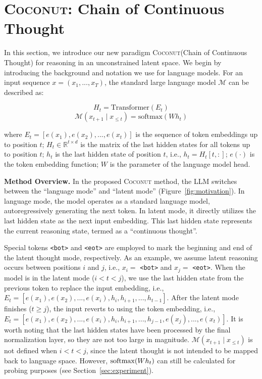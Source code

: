 \documentclass[]{fairmeta}
\newcommand{\ours}{\textsc{Coconut}\xspace}
\begin{document}
\section{\ours: Chain of Continuous Thought}
\label{sec:ours}
In this section, we introduce our new paradigm \ours (Chain of Continuous Thought) for reasoning in an unconstrained latent space. We begin by introducing the background and notation we use for language models. For an input sequence $x = (x_1, ..., x_T)$, the standard large language model $\mathcal{M}$ can be described as:

$$H_t = \text{Transformer}(E_t)$$
$$\mathcal{M}(x_{t+1}\mid x_{\leq t}) = \text{softmax}(Wh_t)$$

where $E_t = [e(x_1), e(x_2), ..., e(x_t)]$ is the sequence of token embeddings up to position $t$;
$H_t \in \mathbb{R}^{t \times d}$ is the matrix of the last hidden states for all tokens up to position $t$; $h_t$ is the last hidden state of position $t$, i.e., $h_t=H_t[t, :]$; $e(\cdot)$ is the token embedding function; $W$ is the parameter of the language model head.

\noindent\textbf{Method Overview.} In the proposed \ours method, the LLM switches between the ``language mode'' and ``latent mode'' (Figure~\ref{fig:motivation}). In language mode, the model operates as a standard language model, autoregressively generating the next token. In latent mode, it directly utilizes the last hidden state as the next input embedding. This last hidden state represents the current reasoning state, termed as a ``continuous thought''.

Special tokens \texttt{<bot>} and \texttt{<eot>} are employed to mark the beginning and end of the latent thought mode, respectively. As an example, we assume latent reasoning occurs between positions $i$ and $j$, i.e., $x_i=$ \texttt{<bot>} and $x_j=$ \texttt{<eot>}. When the model is in the latent mode ($i < t < j$), we use the last hidden state from the previous token to replace the input embedding, i.e., $E_t=[e(x_1), e(x_2), ..., e(x_i), h_i, h_{i+1}, ..., h_{t-1}]$. After the latent mode finishes ($t \ge j$), the input reverts to using the token embedding, i.e., $E_t=[e(x_1), e(x_2), ..., e(x_i), h_i, h_{i+1}, ..., h_{j-1}, e(x_j), ..., e(x_t)]$. 
It is worth noting that the last hidden states have been processed by the final normalization layer, so they are not too large in magnitude.
$\mathcal{M}(x_{t+1}\mid x_{\leq t})$ is not defined when $i<t<j$, since the latent thought is not intended to be mapped back to language space. However, $\mathrm{softmax}(Wh_t)$ can still be calculated for probing purposes (see Section~\ref{sec:experiment}).
\end{document}
